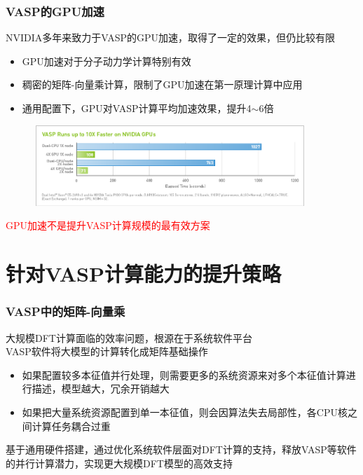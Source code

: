 \frame
{
	\frametitle{\textrm{VASP}的\textrm{GPU}加速}
\textrm{NVIDIA}多年来致力于\textrm{VASP}的\textrm{GPU}加速，取得了一定的效果，但仍比较有限
\begin{itemize}
	\item \textrm{GPU}加速对于分子动力学计算特别有效
	\item 稠密的矩阵-向量乘计算，限制了\textrm{GPU}加速在第一原理计算中应用
	\item 通用配置下，\textrm{GPU}对\textrm{VASP}计算平均加速效果，提升\textrm{4$\sim$6}倍
\end{itemize}
\begin{figure}[h!]
	\vspace{-0.15in}
\centering
\includegraphics[height=1.2in,width=4.05in,viewport=0 0 850 260,clip]{Figures/VASP-GPU-CPU.png}
\label{VASP_GPU}
\end{figure} 
	\vspace{-0.15in}
\textcolor{red}{\textrm{GPU}加速不是提升\textrm{VASP}计算规模的最有效方案}
}

\section{针对\rm{VASP}计算能力的提升策略}
\begin{frame}
	\frametitle{\textrm{VASP}中的矩阵-向量乘}
	大规模\textrm{DFT}计算面临的效率问题，根源在于系统软件平台\\
	{\fontsize{7.2pt}{5.2pt}}
	\vskip 3pt 
\textrm{VASP}软件将大模型的计算转化成矩阵基础操作\\
{\fontsize{7.2pt}{5.2pt}}
	\begin{itemize}
		\item 如果配置较多本征值并行处理，则需要更多的系统资源来对多个本征值计算进行描述，模型越大，冗余开销越大\\
			{\fontsize{7.2pt}{5.2pt}\selectfont{可能影响实用性，甚至超过了现有计算机集群的处理极限}}
		\item 如果把大量系统资源配置到单一本征值，则会因算法失去局部性，各\textrm{CPU}核之间计算任务耦合过重\\
	{\fontsize{7.2pt}{5.2pt}\selectfont{可能造成系统过载}}
	\end{itemize}
	基于通用硬件搭建，通过优化系统软件层面对\textrm{DFT}计算的支持，释放\textrm{VASP}等软件的并行计算潜力，实现更大规模\textrm{DFT}模型的高效支持
\end{frame}


